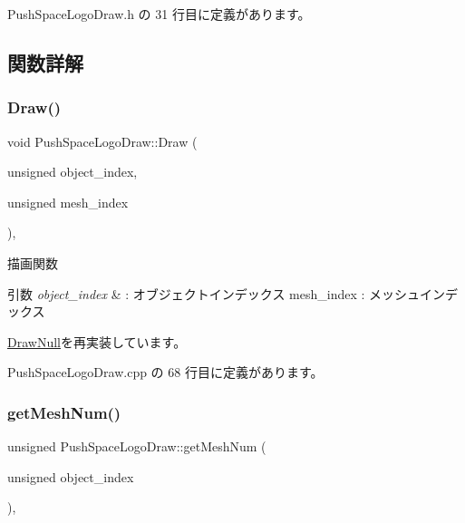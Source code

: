  Push\+Space\+Logo\+Draw.\+h の 31 行目に定義があります。



\subsection{関数詳解}
\mbox{\label{class_push_space_logo_draw_a647dddefc43d66cb3c720ee8fbb6a783}} 
\subsubsection{\texorpdfstring{Draw()}{Draw()}}
{\footnotesize\ttfamily void Push\+Space\+Logo\+Draw\+::\+Draw (\begin{DoxyParamCaption}\item[{unsigned}]{object\+\_\+index,  }\item[{unsigned}]{mesh\+\_\+index }\end{DoxyParamCaption})\hspace{0.3cm}{\ttfamily [override]}, {\ttfamily [virtual]}}



描画関数 


\begin{DoxyParams}{引数}
{\em object\+\_\+index} & \+: オブジェクトインデックス mesh\+\_\+index \+: メッシュインデックス \\
\hline
\end{DoxyParams}


\mbox{\hyperlink{class_draw_null_a72ac0b7dc40b1469582419dcc5b0e114}{Draw\+Null}}を再実装しています。



 Push\+Space\+Logo\+Draw.\+cpp の 68 行目に定義があります。

\mbox{\label{class_push_space_logo_draw_abaa66b6e3c46aa03bae21bad271eebc0}} 
\subsubsection{\texorpdfstring{get\+Mesh\+Num()}{getMeshNum()}}
{\footnotesize\ttfamily unsigned Push\+Space\+Logo\+Draw\+::get\+Mesh\+Num (\begin{DoxyParamCaption}\item[{unsigned}]{object\+\_\+index }\end{DoxyParamCaption})\hspace{0.3cm}{\ttfamily [override]}, {\ttfamily [virtual]}}



